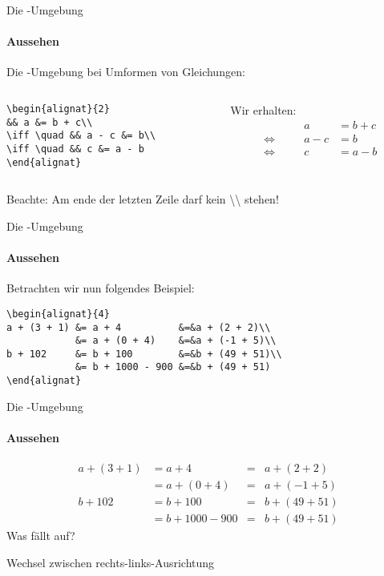 \begin{frame}[fragile]{Die -Umgebung}
\framesubtitle{Aussehen} 
Die -Umgebung bei Umformen von Gleichungen:
\begin{columns}
\begin{column}{.5\textwidth}
\begin{codeblock}
\begin{verbatim}
\begin{alignat}{2}
&& a &= b + c\\
\iff \quad && a - c &= b\\
\iff \quad && c &= a - b
\end{alignat}
\end{verbatim}
\end{codeblock}
\end{column}

\begin{column}{.48\textwidth}
Wir erhalten:
\begin{alignat}{2}
&& a &= b + c\\
\iff \quad && a - c &= b\\
\iff \quad && c &= a - b
\end{alignat}
\end{column}
\end{columns}
\pause
Beachte: \alert{Am ende der letzten Zeile darf kein \textbackslash\textbackslash{} stehen!}
\end{frame}

\begin{frame}[fragile]{Die -Umgebung}
\framesubtitle{Aussehen}
Betrachten wir nun folgendes Beispiel: 

\begin{codeblock}
\begin{verbatim}
\begin{alignat}{4}
a + (3 + 1) &= a + 4          &=&a + (2 + 2)\\
            &= a + (0 + 4)    &=&a + (-1 + 5)\\
b + 102     &= b + 100        &=&b + (49 + 51)\\
            &= b + 1000 - 900 &=&b + (49 + 51)
\end{alignat}
\end{verbatim}
\end{codeblock}
\end{frame}

\begin{frame}{Die -Umgebung}
\framesubtitle{Aussehen}
\begin{alignat}{4}
a + (3 + 1) &= a + 4          &=&a + (2 + 2)\\
            &= a + (0 + 4)    &=&a + (-1 + 5)\\
b + 102     &= b + 100        &=&b + (49 + 51)\\
            &= b + 1000 - 900 &=&b + (49 + 51)
\end{alignat}
Was fällt auf?

\medskip
\pause
Wechsel zwischen rechts-links-Ausrichtung
\end{frame}

